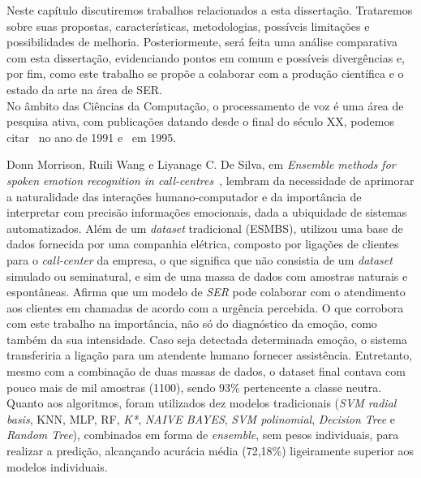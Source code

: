 \label{Cap:Trabalhos Relacionados}

Neste capítulo discutiremos trabalhos relacionados a esta dissertação. Trataremos sobre suas propostas, características, metodologias, possíveis limitações e possibilidades de melhoria. Posteriormente, será feita uma análise comparativa com esta dissertação, evidenciando pontos em comum e possíveis divergências e, por fim, como este trabalho se propõe a colaborar com a produção científica e o estado da arte na área de \acrshort{SER}.\\


No âmbito das Ciências da Computação, o processamento de voz é uma área de pesquisa ativa, com publicações datando desde o final do século XX, podemos citar~\cite{12.27} no ano de 1991 e~\cite{12.28} em 1995.


Donn Morrison, Ruili Wang e Liyanage C. De Silva, em \textit{Ensemble methods for spoken emotion recognition in call-centres}~\cite{32.32}, lembram da necessidade de aprimorar a naturalidade das interações humano-computador e da importância de interpretar com precisão informações emocionais, dada a ubiquidade de sistemas automatizados. Além de um \textit{dataset} tradicional (ESMBS), utilizou uma base de dados fornecida por uma companhia elétrica, composto por ligações de clientes para o \textit{call-center} da empresa, o que significa que não consistia de um \textit{dataset} simulado ou seminatural, e sim de uma massa de dados com amostras naturais e espontâneas. Afirma que um modelo de \textit{SER} pode colaborar com o atendimento aos clientes em chamadas de acordo com a urgência percebida. O que corrobora com este trabalho na importância, não só do diagnóstico da emoção, como também da sua intensidade. Caso seja detectada determinada emoção, o sistema transferiria a ligação para um atendente humano fornecer assistência. Entretanto, mesmo com a combinação de duas massas de dados, o dataset final contava com pouco mais de mil amostras (1100), sendo 93\% pertencente a classe neutra. Quanto aos algoritmos, foram utilizados dez modelos tradicionais (\textit{SVM radial basis}, \acrshort{KNN}, \acrshort{MLP}, \acrshort{RF}, \textit{K*}, \textit{NAIVE BAYES}, \textit{SVM polinomial}, \textit{Decision Tree} e \textit{Random Tree}), combinados em forma de \textit{ensemble}, sem pesos individuais, para realizar a predição, alcançando acurácia média (72,18\%) ligeiramente superior aos modelos individuais.

